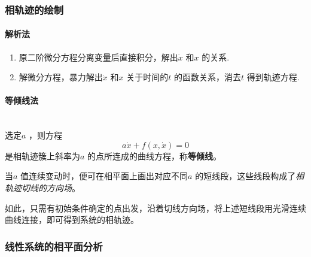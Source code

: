\documentclass[14pt,a4paper]{article}
\theoremstyle{plain}
\theoremstyle{definition}
\theoremstyle{remark}
\theoremstyle{plain}
\theoremstyle{plain}
\theoremstyle{plain}
\theoremstyle{definition}
\theoremstyle{remark}
\numberwithin{equation}{section}
\begin{document}
			\subsubsection{相轨迹的绘制}%
			\label{ssub:相轨迹的绘制}
		
				\paragraph{解析法}%
				\label{par:解析法} 

					\begin{enumerate}[法 1.]
						\item 原二阶微分方程分离变量后直接积分，解出$\dot x$ 和$x$ 的关系. 
						\item 解微分方程，暴力解出$\dot x$ 和$x$ 关于时间的$t$ 的函数关系，消去$t$ 得到轨迹方程. 
					\end{enumerate} 

				\paragraph{等倾线法}%
				\label{par:等倾线法}
				\ \\
				\indent 选定$a$ ，则方程
					\begin{equation}
					\label{eq:isoclinic}
						a\dot x + f(x, \dot x) = 0
					\end{equation} 
					是相轨迹簇上斜率为$a$ 的点所连成的曲线方程，称\textbf{等倾线}。
		
					当$a$ 值连续变动时，便可在相平面上画出对应不同$a$ 的短线段，这些线段构成了\emph{相轨迹切线的方向场}。 

					如此，只需有初始条件确定的点出发，沿着切线方向场，将上述短线段用光滑连续曲线连接，即可得到系统的相轨迹。 


			\subsubsection{线性系统的相平面分析}%
			\label{ssub:线性系统的相平面分析}
	
\end{document}
